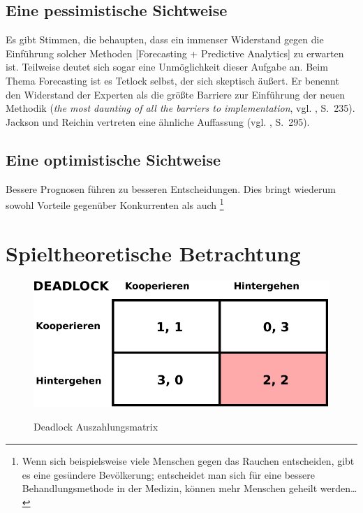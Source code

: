 \documentclass[12pt,a4paper,listof=totoc,oneside]{scrreprt}
\begin{document}
\subsection{Eine pessimistische Sichtweise}

Es gibt Stimmen, die behaupten, dass ein immenser Widerstand gegen die
Einführung solcher Methoden [Forecasting + Predictive Analytics] zu erwarten
ist. Teilweise deutet sich sogar eine Unmöglichkeit dieser Aufgabe an. Beim 
Thema Forecasting ist es Tetlock selbst, der sich skeptisch äußert. Er
benennt den Widerstand der Experten als die größte Barriere zur Einführung der
neuen Methodik (\emph{the most daunting of all the barriers to implementation},
vgl. \cite{Tetlock}, S.~235). Jackson und Reichin vertreten eine ähnliche
Auffassung (vgl. \cite{Jackson}, S.~295).

\subsection{Eine optimistische Sichtweise}

Bessere Prognosen führen zu besseren Entscheidungen. Dies bringt wiederum
sowohl Vorteile gegenüber Konkurrenten als auch
\grqq\footnote{
Wenn sich beispielsweise viele Menschen gegen das Rauchen entscheiden, gibt es
eine gesündere Bevölkerung; entscheidet man sich für eine bessere
Behandlungsmethode in der Medizin, können mehr Menschen geheilt werden\ldots
}

\section{Spieltheoretische Betrachtung}



\begin{figure}%
\centering
\caption{Deadlock Auszahlungsmatrix}
\includegraphics[scale=0.8]{Grafiken/Deadlock_Ink.pdf} 
\label{pic:Deadlock}
\end{figure}
\end{document}
